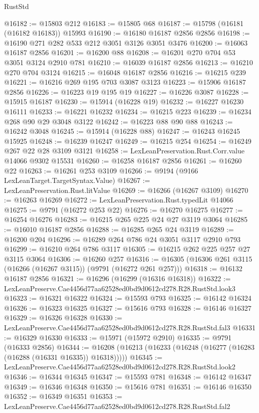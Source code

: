 \begin{lexlean}{RustStd}
\begin{coremodule}
@16182 := @15803 @212
@16183 := @15805 @68
@16187 := @15798 (@16181 (@16182 @16183)) @15993
@16190 := @16180 @16187 @2856 @2856
@16198 := @16190 @271 @282 @533 @212 @3051 @3126 @3051 @3476
@16200 := @16063 @16187 @2856
@16201 := @16200 @88
@16208 := @16201 @270 @704 @53 @3051 @3124 @2910 @781
@16210 := @16039 @16187 @2856
@16213 := @16210 @270 @704 @3124
@16215 := @16048 @16187 @2856
@16216 := @16215 @239
@16221 := @16216 @269 @195 @703 @3087 @3123
@16223 := @15906 @16187 @2856
@16226 := @16223 @19 @195 @19
@16227 := @16226 @3087
@16228 := @15915 @16187
@16230 := @15914 (@16228 @19)
@16232 := @16227 @16230 @16111
@16233 := @16221 @16232
@16234 := @16215 @223
@16239 := @16234 @268 @90 @29 @3048 @3122
@16242 := @16223 @88 @90 @88
@16243 := @16242 @3048
@16245 := @15914 (@16228 @88)
@16247 := @16243 @16245 @15925
@16248 := @16239 @16247
@16249 := @16215 @254
@16254 := @16249 @267 @22 @28 @3109 @3121
@16258 := LexLeanPreservation.Rust.Corr.value @14066 @9302 @15531
@16260 := @16258 @16187 @2856
@16261 := @16260 @22
@16263 := @16261 @253 @3109
@16266 := @9194 (@9166 LexLeanTarget.TargetSyntax.Value)
@16267 := LexLeanPreservation.Rust.litValue
@16269 := @16266 (@16267 @3109)
@16270 := @16263 @16269
@16272 := LexLeanPreservation.Rust.typedLit @14066
@16275 := @9791 (@16272 @253 @22)
@16276 := @16270 @16275
@16277 := @16254 @16276
@16283 := @16215 @265 @225 @24 @27 @3119 @3064
@16285 := @16010 @16187 @2856
@16288 := @16285 @265 @24 @3119
@16289 := @16200 @204
@16296 := @16289 @264 @786 @24 @3051 @3117 @2910 @793
@16299 := @16210 @264 @786 @3117
@16305 := @16215 @262 @225 @257 @27 @3115 @3064
@16306 := @16260 @257
@16316 := @16305 (@16306 @261 @3115 (@16266 (@16267 @3115)) (@9791 (@16272 @261 @257)))
@16318 := @16132 @16187 @2856
@16321 := @16296 (@16299 (@16316 @16318))
@16322 := LexLeanPreserve.Cae4456d77aa62528ed0bd9d0612cd278.R28.RustStd.look3
@16323 := @16321 @16322
@16324 := @15593 @793
@16325 := @16142 @16324
@16326 := @16323 @16325
@16327 := @15616 @793
@16328 := @16146 @16327
@16329 := @16326 @16328
@16330 := LexLeanPreserve.Cae4456d77aa62528ed0bd9d0612cd278.R28.RustStd.fal3
@16331 := @16329 @16330
@16333 := @15971 (@15972 @2910)
@16335 := @9791 (@16333 @2856)
@16344 := @16208 (@16213 (@16233 (@16248 (@16277 (@16283 (@16288 (@16331 @16335)) @16318)))))
@16345 := LexLeanPreserve.Cae4456d77aa62528ed0bd9d0612cd278.R28.RustStd.look2
@16346 := @16344 @16345
@16347 := @15593 @781
@16348 := @16142 @16347
@16349 := @16346 @16348
@16350 := @15616 @781
@16351 := @16146 @16350
@16352 := @16349 @16351
@16353 := LexLeanPreserve.Cae4456d77aa62528ed0bd9d0612cd278.R28.RustStd.fal2

\end{coremodule}
\end{lexlean}
